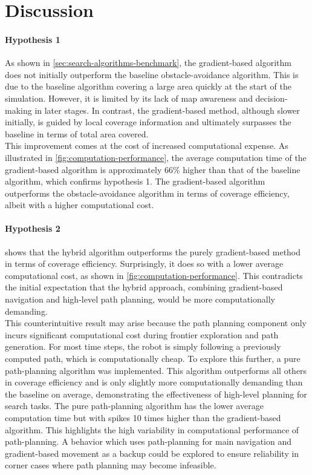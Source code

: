 \section{Discussion}
\paragraph{Hypothesis 1}
As shown in \cref{sec:search-algorithms-benchmark}, the gradient-based algorithm does not initially outperform the baseline obstacle-avoidance algorithm. This is due to the baseline algorithm covering a large area quickly at the start of the simulation. However, it is limited by its lack of map awareness and decision-making in later stages. In contrast, the gradient-based method, although slower initially, is guided by local coverage information and ultimately surpasses the baseline in terms of total area covered.\\

This improvement comes at the cost of increased computational expense. As illustrated in \cref{fig:computation-performance}, the average computation time of the gradient-based algorithm is approximately 66\% higher than that of the baseline algorithm, which confirms hypothesis 1. The gradient-based algorithm outperforms the obstacle-avoidance algorithm in terms of coverage efficiency, albeit with a higher computational cost.

\paragraph{Hypothesis 2}
 shows that the hybrid algorithm outperforms the purely gradient-based method in terms of coverage efficiency. Surprisingly, it does so with a lower average computational cost, as shown in \cref{fig:computation-performance}. This contradicts the initial expectation that the hybrid approach, combining gradient-based navigation and high-level path planning, would be more computationally demanding. \\

This counterintuitive result may arise because the path planning component only incurs significant computational cost during frontier exploration and path generation. For most time steps, the robot is simply following a previously computed path, which is computationally cheap. To explore this further, a pure path-planning algorithm was implemented. This algorithm outperforms all others in coverage efficiency and is only slightly more computationally demanding than the baseline on average, demonstrating the effectiveness of high-level planning for search tasks. The pure path-planning algorithm has the lower average computation time but with spikes 10 times higher than the gradient-based algorithm. This highlights the high variability in computational performance of path-planning. A behavior which uses path-planning for main navigation and gradient-based movement as a backup could be explored to ensure reliability in corner cases where path planning may become infeasible.

